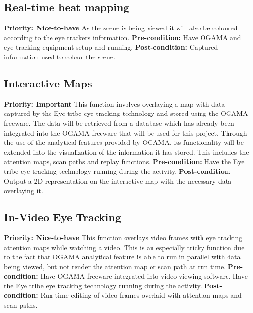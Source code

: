 \subsection{Real-time heat mapping}
    \textbf{Priority: Nice-to-have}\newline
    As the scene is being viewed it will also be coloured according to the eye trackers information.\newline
    \textbf{Pre-condition: }
    Have OGAMA and eye tracking equipment setup and running.\newline
    \textbf{Post-condition: }
    Captured information used to colour the scene.
    
\subsection{Interactive Maps}
    \textbf{Priority: Important}\newline
    This function involves overlaying a map with data captured by the Eye tribe eye tracking technology and stored using the OGAMA freeware. The data will be retrieved from a database which has already been integrated into the OGAMA freeware that will be used for this project. Through the use of the analytical features provided by OGAMA, its functionality will be extended into the visualization of the information it has stored. This includes the attention maps, scan paths and replay functions.\newline
    \textbf{Pre-condition: } Have the Eye tribe eye tracking technology running during the activity.\newline   
    \textbf{Post-condition: }Output a 2D representation on the interactive map with the necessary data overlaying it. 
    
\subsection{In-Video Eye Tracking}
    \textbf{Priority: Nice-to-have}\newline
    This function overlays video frames with eye tracking attention maps while watching a video. This is an especially tricky function due to the fact that OGAMA analytical feature is able to run in parallel with data being viewed, but not render the attention map or scan path at run time.\newline
    \textbf{Pre-condition: }Have OGAMA freeware integrated into video viewing software. Have the Eye tribe eye tracking technology running during the activity.\newline
    \textbf{Post-condition: }Run time editing of video frames overlaid with attention maps and scan paths.

